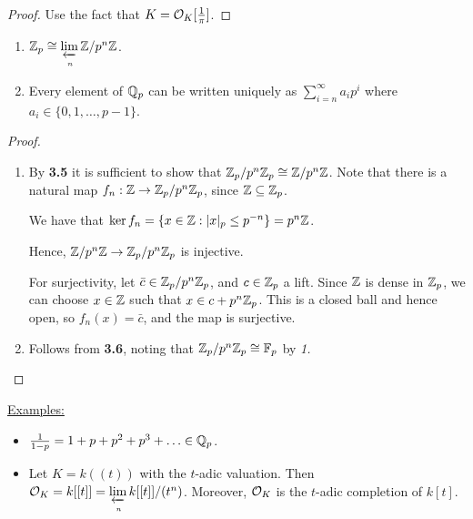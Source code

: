 \documentclass[10pt,a4paper]{article}
\begin{document}
\begin{proof}
  Use the fact that $K = \mathcal{O}_K[\frac{1}{\pi}]$.
\end{proof}
\begin{corollary}\hspace*{0cm}
  \begin{enumerate}
    \item $\mathbb{Z}_p \cong \lim\limits_{\xleftarrow[n]{}} \mathbb{Z}/p^n\mathbb{Z}$.
    \item Every element of $\mathbb{Q}_p$ can be written uniquely as $\sum_{i=n}^\infty a_i p^i$ where $a_i \in \{0, 1, \ldots, p-1\}$.
  \end{enumerate}
\end{corollary}
\begin{proof}\hspace*{0cm}
  \begin{enumerate}[label=\textit{\arabic*.}]
    \item By \textbf{3.5} it is sufficient to show that $\mathbb{Z}_p/p^n\mathbb{Z}_p \cong \mathbb{Z}/p^n\mathbb{Z}$. Note that there is a natural map $f_n : \mathbb{Z} \to \mathbb{Z}_p/p^n\mathbb{Z}_p$, since $\mathbb{Z} \subseteq \mathbb{Z}_p$.

    We have that $\ker f_n = \{x \in \mathbb{Z} : |x|_p \leq p^{-n}\} = p^n \mathbb{Z}$.

    Hence, $\mathbb{Z}/p^n\mathbb{Z} \to \mathbb{Z}_p/p^n\mathbb{Z}_p$ is injective.

    For surjectivity, let $\bar{c} \in \mathbb{Z}_p/p^n\mathbb{Z}_p$, and $c \in \mathbb{Z}_p$ a lift. Since $\mathbb{Z}$ is dense in $\mathbb{Z}_p$, we can choose $x \in \mathbb{Z}$ such that $x \in c + p^n\mathbb{Z}_p$. This is a closed ball and hence open, so $f_n(x) = \bar{c}$, and the map is surjective.

    \item Follows from \textbf{3.6}, noting that $\mathbb{Z}_p/p^n\mathbb{Z}_p \cong \mathbb{F}_p$ by \textit{1.}
  \end{enumerate}
\end{proof}

\underline{Examples:}
\begin{itemize}
  \item $\frac{1}{1-p} = 1 + p + p^2 + p^3 + \ldots \in \mathbb{Q}_p$.
  \item Let $K = k((t))$ with the $t$-adic valuation. Then $\mathcal{O}_K = k[[t]] = \lim\limits_{\xleftarrow[n]{}} k[[t]]/(t^n)$. Moreover, $\mathcal{O}_K$ is the $t$-adic completion of $k[t]$.
\end{itemize}
\end{document}
